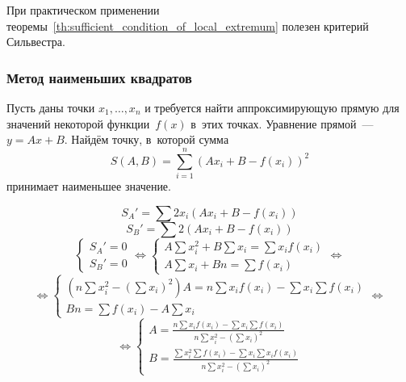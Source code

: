 При практическом применении теоремы~\ref*{th:sufficient_condition_of_local_extremum} полезен критерий Сильвестра.
	
\subsubsection{Метод наименьших квадратов}
Пусть даны точки $x_1, \ldots, x_n$ и требуется найти аппроксимирующую прямую для значений некоторой функции~$f(x)$ в~этих точках.
Уравнение прямой~--- $y = Ax + B$.
Найдём точку, в~которой сумма
\begin{equation*}
S(A, B) = \sum_{i=1}^n (A x_i + B - f(x_i))^2
\end{equation*}
принимает наименьшее значение.
	
\begin{equation*}
S_A' = \sum 2 x_i (A x_i + B - f(x_i))
\end{equation*}
\begin{equation*}
S_B' = \sum 2 (A x_i + B - f(x_i))
\end{equation*}
\begin{equation*}
\begin{cases}
\displaystyle S_A' = 0 \\
\displaystyle S_B' = 0
\end{cases}
\Leftrightarrow
\begin{cases}
\displaystyle A \sum x_i^2 + B \sum x_i = \sum x_i f(x_i) \\
\displaystyle A \sum x_i + Bn = \sum f(x_i)
\end{cases}
\Leftrightarrow
\end{equation*}
\begin{equation*}
\Leftrightarrow
\begin{cases}
\displaystyle \left(n \sum x_i^2 - \left(\sum x_i\right)^2\right)A = n \sum x_i f(x_i) - \sum x_i \sum f(x_i) \\
\displaystyle Bn = \sum f(x_i) - A \sum x_i
\end{cases}
\Leftrightarrow
\end{equation*}
\begin{equation*}
\Leftrightarrow
\begin{cases}
\displaystyle A = \frac{\displaystyle n \sum x_i f(x_i) - \sum x_i \sum f(x_i)}{\displaystyle n \sum x_i^2 - \left(\sum x_i\right)^2} \\
\displaystyle B = \frac{\displaystyle \sum x_i^2 \sum f(x_i) - \sum x_i \sum x_i f(x_i)}{\displaystyle n \sum x_i^2 - \left(\sum x_i\right)^2}
\end{cases}
\end{equation*}
	
